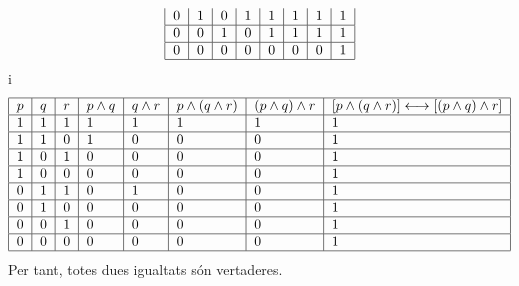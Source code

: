 \begin{solucio}
\begin{equation*}
\begin{tabular}{|l|l|l|l|l|l|l|l|}
$0$ & $1$ & $0$ & $1$ & $1$ & $1$ & $1$ & $1$ \\ \hline
$0$ & $0$ & $1$ & $0$ & $1$ & $1$ & $1$ & $1$ \\ \hline
$0$ & $0$ & $0$ & $0$ & $0$ & $0$ & $0$ & $1$ \\ \hline
\end{tabular}%
\end{equation*}%
i%
\begin{equation*}
\begin{tabular}{|l|l|l|l|l|l|l|l|}
\hline
$p$ & $q$ & $r$ & $p\wedge q$ & $q\wedge r$ & $p\wedge (q\wedge r)$ & $%
(p\wedge q)\wedge r$ & $\left[ p\wedge (q\wedge r)\right]
\longleftrightarrow \left[ (p\wedge q)\wedge r\right] $ \\ \hline
$1$ & $1$ & $1$ & $1$ & $1$ & $1$ & $1$ & $1$ \\ \hline
$1$ & $1$ & $0$ & $1$ & $0$ & $0$ & $0$ & $1$ \\ \hline
$1$ & $0$ & $1$ & $0$ & $0$ & $0$ & $0$ & $1$ \\ \hline
$1$ & $0$ & $0$ & $0$ & $0$ & $0$ & $0$ & $1$ \\ \hline
$0$ & $1$ & $1$ & $0$ & $1$ & $0$ & $0$ & $1$ \\ \hline
$0$ & $1$ & $0$ & $0$ & $0$ & $0$ & $0$ & $1$ \\ \hline
$0$ & $0$ & $1$ & $0$ & $0$ & $0$ & $0$ & $1$ \\ \hline
$0$ & $0$ & $0$ & $0$ & $0$ & $0$ & $0$ & $1$ \\ \hline
\end{tabular}%
\end{equation*}%
Per tant, totes dues igualtats s\'{o}n vertaderes.


\end{solucio}
